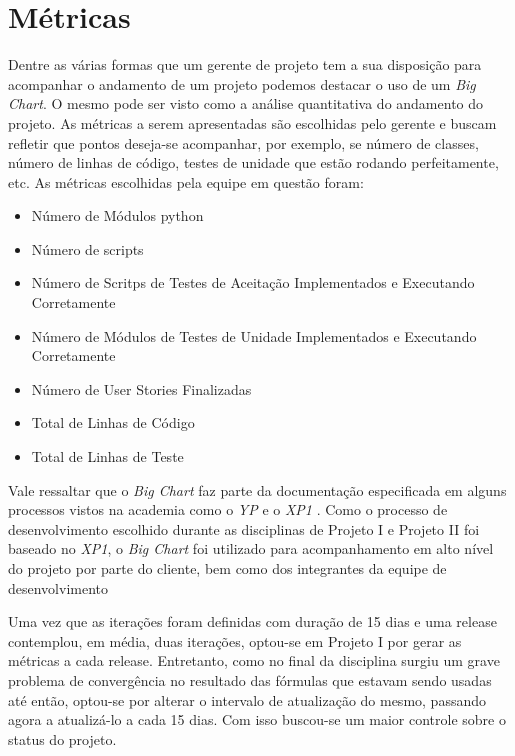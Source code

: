 \chapter{Métricas}

Dentre as várias formas que um gerente de projeto tem a sua disposição para acompanhar o andamento de um projeto podemos destacar o uso de um \textit{Big Chart}. O mesmo pode ser visto como a análise quantitativa do andamento do projeto. As métricas a serem apresentadas são escolhidas pelo gerente e buscam refletir que pontos deseja-se acompanhar, por exemplo, se número de classes, número de linhas de código, testes de unidade que estão rodando perfeitamente, etc. As métricas escolhidas pela equipe em questão foram:

\begin{itemize}
 \item Número de Módulos python
 \item Número de scripts
 \item Número de Scritps de Testes de Aceitação Implementados e Executando Corretamente
 \item Número de Módulos de Testes de Unidade Implementados e Executando Corretamente
 \item Número de User Stories Finalizadas
 \item Total de Linhas de Código
 \item Total de Linhas de Teste
\end{itemize}


Vale ressaltar que o \textit{Big Chart} faz parte da documentação especificada em alguns processos vistos na academia como o \textit{YP} \cite{yp} e o \textit{XP1} \cite{xp1}. Como o processo de desenvolvimento escolhido durante as disciplinas de Projeto I e Projeto II foi baseado no \textit{XP1}, o \textit{Big Chart} foi utilizado para acompanhamento em alto nível do projeto por parte do cliente, bem como dos integrantes da equipe de desenvolvimento

Uma vez que as iterações foram definidas com duração de 15 dias e uma release contemplou, em média, duas iterações, optou-se em Projeto I por gerar as métricas a cada release. Entretanto, como no final da disciplina surgiu um grave problema de convergência no resultado das fórmulas que estavam sendo usadas até então, optou-se por alterar o intervalo de atualização do mesmo, passando agora a atualizá-lo a cada 15 dias. Com isso buscou-se um maior controle sobre o status do projeto.

